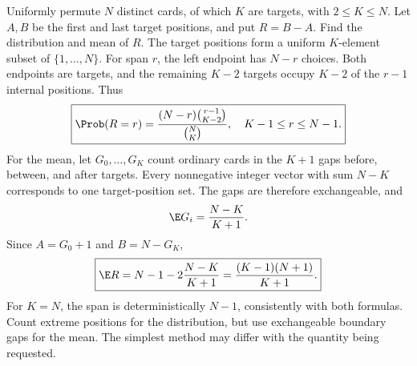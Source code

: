 Uniformly permute $N$ distinct cards, of which $K$ are targets, with $2\le K\le N$. Let $A,B$ be the first and last target positions, and put $R=B-A$. Find the distribution and mean of $R$.
\solution The target positions form a uniform $K$-element subset of $\{1,\ldots,N\}$. For span $r$, the left endpoint has $N-r$ choices. Both endpoints are targets, and the remaining $K-2$ targets occupy $K-2$ of the $r-1$ internal positions. Thus
\[
\boxed{\Prob(R=r)=\frac{(N-r)\binom{r-1}{K-2}}{\binom NK},
\quad K-1\le r\le N-1.}
\]
For the mean, let $G_0,\ldots,G_K$ count ordinary cards in the $K+1$ gaps before, between, and after targets. Every nonnegative integer vector with sum $N-K$ corresponds to one target-position set. The gaps are therefore exchangeable, and
\[
\E G_i=\frac{N-K}{K+1}.
\]
Since $A=G_0+1$ and $B=N-G_K$,
\[
\boxed{\E R=N-1-2\frac{N-K}{K+1}
=\frac{(K-1)(N+1)}{K+1}.}
\]
For $K=N$, the span is deterministically $N-1$, consistently with both formulas.
\insight Count extreme positions for the distribution, but use exchangeable boundary gaps for the mean. The simplest method may differ with the quantity being requested.
